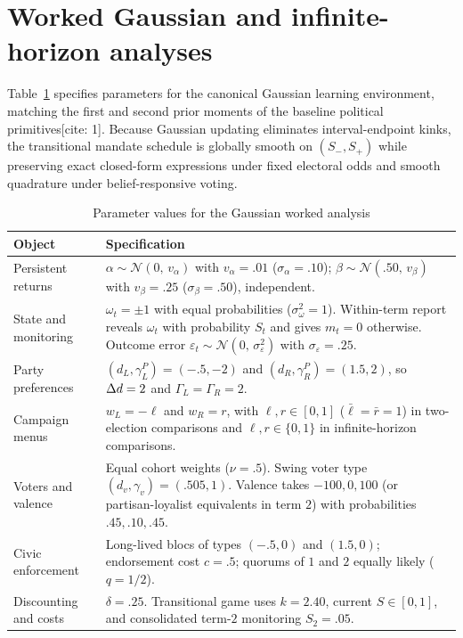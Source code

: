 \section{Worked Gaussian and infinite-horizon analyses}\label{sec:example}

Table~\ref{tab:params} specifies parameters for the canonical Gaussian learning environment, matching the first and second prior moments of the baseline political primitives[cite: 1]. Because Gaussian updating eliminates interval-endpoint kinks, the transitional mandate schedule is globally smooth on $(S_-,S_+)$ while preserving exact closed-form expressions under fixed electoral odds and smooth quadrature under belief-responsive voting.

\begin{table}[htbp]\centering\small
\caption{Parameter values for the Gaussian worked analysis}\label{tab:params}
\begin{tabular}{@{}p{.27\linewidth}p{.66\linewidth}@{}}
\toprule
Object & Specification\\ \midrule
Persistent returns & $\alpha\sim\mathcal N(0,\,v_\alpha)$ with $v_\alpha=.01$ ($\sigma_\alpha=.10$); $\beta\sim\mathcal N(.50,\,v_\beta)$ with $v_\beta=.25$ ($\sigma_\beta=.50$), independent.\\
State and monitoring & $\omega_t=\pm 1$ with equal probabilities ($\sigma_\omega^2=1$). Within-term report reveals $\omega_t$ with probability $S_t$ and gives $m_t=0$ otherwise. Outcome error $\varepsilon_t\sim\mathcal N(0,\,\sigma_\varepsilon^2)$ with $\sigma_\varepsilon=.25$.\\
Party preferences & $(d_L,\gamma_L^P)=(-.5,-2)$ and $(d_R,\gamma_R^P)=(1.5,2)$, so $\Delta d=2$ and $\Gamma_L=\Gamma_R=2$.\\
Campaign menus & $w_L=-\ell$ and $w_R=r$, with $\ell,r\in[0,1]$ ($\bar\ell=\bar r=1$) in two-election comparisons and $\ell,r\in\{0,1\}$ in infinite-horizon comparisons.\\
Voters and valence & Equal cohort weights ($\nu=.5$). Swing voter type $(d_v,\gamma_v)=(.505,1)$. Valence takes $-100,0,100$ (or partisan-loyalist equivalents in term $2$) with probabilities $.45,.10,.45$.\\
Civic enforcement & Long-lived blocs of types $(-.5,0)$ and $(1.5,0)$; endorsement cost $c=.5$; quorums of $1$ and $2$ equally likely ($q=1/2$).\\
Discounting and costs & $\delta=.25$. Transitional game uses $k=2.40$, current $S\in[0,1]$, and consolidated term-$2$ monitoring $S_2=.05$.\\
\bottomrule
\end{tabular}
\end{table}

